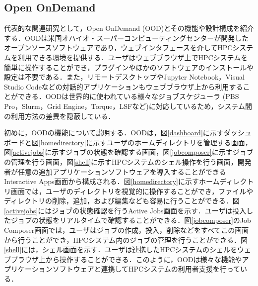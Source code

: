 \subsection{Open OnDemand}
代表的な関連研究として，Open OnDemand (OOD)とその機能や設計構成を紹介する\cite{cite2,cite3}．OODは米国オハイオ・スーパーコンピューティングセンターが開発したオープンソースソフトウェアであり，ウェブインタフェースを介してHPCシステムを利用できる環境を提供する．ユーザはウェブブラウザ上でHPCシステムを簡単に操作することができ，プラグインやほかのソフトウェアのインストールや設定は不要である．また，リモートデスクトップやJupyter Notebook\cite{jupyternotebook}，Visual Studio Code\cite{VSCode}などの対話的アプリケーションもウェブブラウザ上から利用することができる．OODは世界的に使われている様々なジョブスケジューラ (PBS Pro\cite{PBS_Pro}，Slurm\cite{Slurm}，Grid Engine\cite{Grid_Engine}，Torque\cite{TORQUE}，LSF\cite{LSF}など)に対応しているため，システム間の利用方法の差異を隠蔽している．\par
初めに，OODの機能について説明する．OODは，図\ref{dashboard}に示すダッシュボードと図\ref{homedirectory}に示すユーザのホームディレクトリを管理する画面，図\ref{activejobs}に示すジョブの状態を確認する画面，図\ref{jobcomposer}に示すジョブの管理を行う画面，図\ref{shell}に示すHPCシステムのシェル操作を行う画面，開発者が任意の追加アプリケーションソフトウェアを導入することができるInteractive Apps画面から構成される．図\ref{homedirectory}に示すホームディレクトリ画面では，ユーザのディレクトリを視覚的に操作することができ，ファイルやディレクトリの削除，追加，および編集なども容易に行うことができる．図\ref{activejobs}にはジョブの状態確認を行うActive Jobs画面を示す．ユーザは投入したジョブの状態をリアルタイムで確認することができる．図\ref{jobcomposer}のJob Composer画面では，ユーザはジョブの作成，投入，削除などをすべてこの画面から行うことができ，HPCシステム内のジョブの管理を行うことができる．図\ref{shell}には，シェル画面を示す．ユーザは連携したHPCシステムのシェルをウェブブラウザ上から操作することができる．このように，OODは様々な機能やアプリケーションソフトウェアと連携してHPCシステムの利用者支援を行っている．\par
